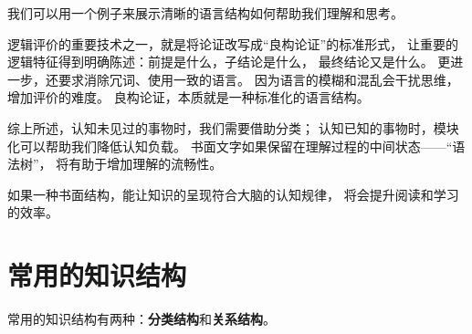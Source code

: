 \documentclass[../main.tex]{subfiles}
\begin{document}
我们可以用一个例子来展示清晰的语言结构如何帮助我们理解和思考。

逻辑评价的重要技术之一，就是将论证改写成``良构论证''的标准形式，
让重要的逻辑特征得到明确陈述：前提是什么，子结论是什么，
最终结论又是什么。
更进一步，还要求消除冗词、使用一致的语言。
因为语言的模糊和混乱会干扰思维，增加评价的难度。
良构论证，本质就是一种标准化的语言结构。

综上所述，认知未见过的事物时，我们需要借助分类；
认知已知的事物时，模块化可以帮助我们降低认知负载。
书面文字如果保留在理解过程的中间状态——``语法树''，
将有助于增加理解的流畅性。

如果一种书面结构，能让知识的呈现符合大脑的认知规律，
将会提升阅读和学习的效率。
%
\section{常用的知识结构}
常用的知识结构有两种：\textbf{分类结构}和\textbf{关系结构}。
%
\end{document}
